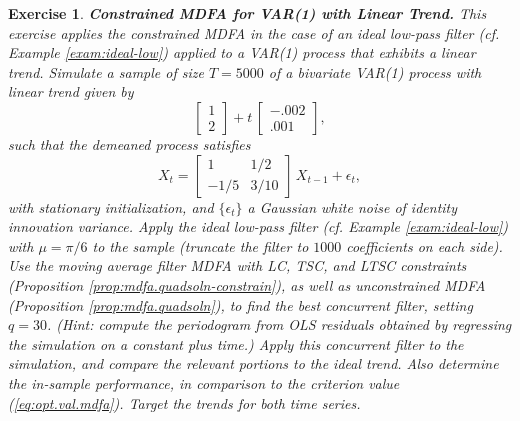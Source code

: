 \documentclass[a4paper]{book}
\newtheorem{Exercise}{Exercise}
\begin{document}
\begin{Exercise} {\bf  Constrained MDFA for VAR(1) with Linear Trend.} \rm
\label{exer:var1trend-mdfa}
This exercise applies the constrained MDFA in the case of an ideal low-pass filter
 (cf. Example \ref{exam:ideal-low}) 
 applied to a VAR(1) process that exhibits a linear trend.
 Simulate a sample of size $T=5000$ of a
   bivariate VAR(1) process with linear trend  given by
   \begin{equation}
   \label{eq:wntrend-lin.trend}
    \left[ \begin{array}{c} 1 \\ 2 \end{array} \right] + t \, 
    \left[ \begin{array}{c} -.002 \\ .001 \end{array} \right],
   \end{equation}
    such that the demeaned process satisfies
\[
  X_t =  \left[ \begin{array}{cc}  1  & 1/2 \\    -1/5  &  3/10
    \end{array} \right] \, X_{t-1} + \epsilon_t,
\]
 with stationary initialization, and $\{ \epsilon_t \}$ a Gaussian white noise of identity innovation variance.   Apply the   ideal low-pass filter
  (cf. Example \ref{exam:ideal-low}) with 
  $\mu = \pi/6$ to the sample (truncate the filter to $1000$ coefficients on each side).  
 Use the moving average filter  MDFA  with LC, TSC, and LTSC constraints
  (Proposition \ref{prop:mdfa.quadsoln-constrain}),
  as well as unconstrained MDFA  (Proposition \ref{prop:mdfa.quadsoln}), to find the best
 concurrent filter, setting $q= 30$. 
  (Hint: compute the periodogram from OLS residuals obtained by regressing the simulation
   on a constant plus time.)
 Apply this concurrent filter 
 to the simulation, and compare the relevant portions to the ideal trend.
 Also determine the in-sample performance, in comparison to the criterion value
 (\ref{eq:opt.val.mdfa}).   Target the trends for both time series.
\end{Exercise}
\end{document}
